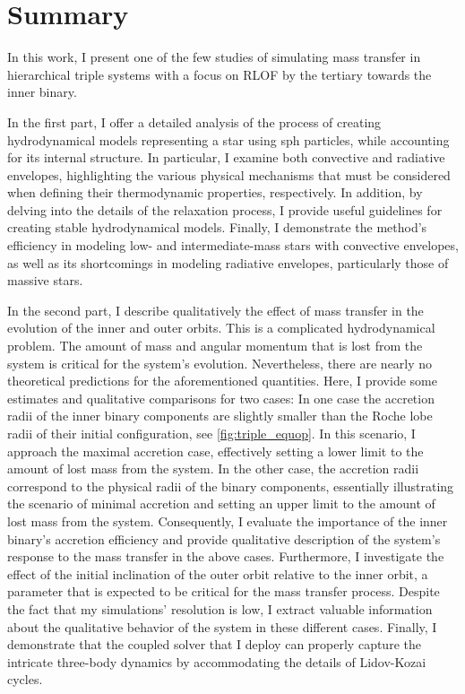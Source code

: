 \section{Summary}

In this work, I present one of the few studies of simulating mass transfer in hierarchical triple systems with a focus on RLOF by the tertiary towards the inner binary. 

In the first part, I offer a detailed analysis of the process of creating hydrodynamical models representing a star using \ac{sph} particles, while accounting for its internal structure. In particular, I examine both convective and radiative envelopes, highlighting the various physical mechanisms that must be considered when defining their thermodynamic properties, respectively. In addition, by delving into the details of the relaxation process, I provide useful guidelines for creating stable hydrodynamical models. Finally, I demonstrate the method's efficiency in modeling low- and intermediate-mass stars with convective envelopes, as well as its shortcomings in modeling radiative envelopes, particularly those of massive stars.

In the second part, I describe qualitatively the effect of mass transfer in the evolution of the inner and outer orbits. This is a complicated hydrodynamical problem. The amount of mass and angular momentum that is lost from the system is critical for the system's evolution. Nevertheless, there are nearly no theoretical predictions for the aforementioned quantities. Here, I provide some estimates and qualitative comparisons for two cases: In one case the accretion radii of the inner binary components are slightly smaller than the Roche lobe radii of their initial configuration, see \cref{fig:triple_equop}. In this scenario, I approach the maximal accretion case, effectively setting a lower limit to the amount of lost mass from the system. In the other case, the accretion radii correspond to the physical radii of the binary components, essentially illustrating the scenario of minimal accretion and setting an upper limit to the amount of lost mass from the system. Consequently, I evaluate the importance of the inner binary's accretion efficiency and provide qualitative description of the system's response to the mass transfer in the above cases. Furthermore, I investigate the effect of the initial inclination of the outer orbit relative to the inner orbit, a parameter that is expected to be critical for the mass transfer process. Despite the fact that my simulations' resolution is low, I extract valuable information about the qualitative behavior of the system in these different cases. Finally, I demonstrate that the coupled solver that I deploy can properly capture the intricate three-body dynamics by accommodating the details of Lidov-Kozai cycles. 

